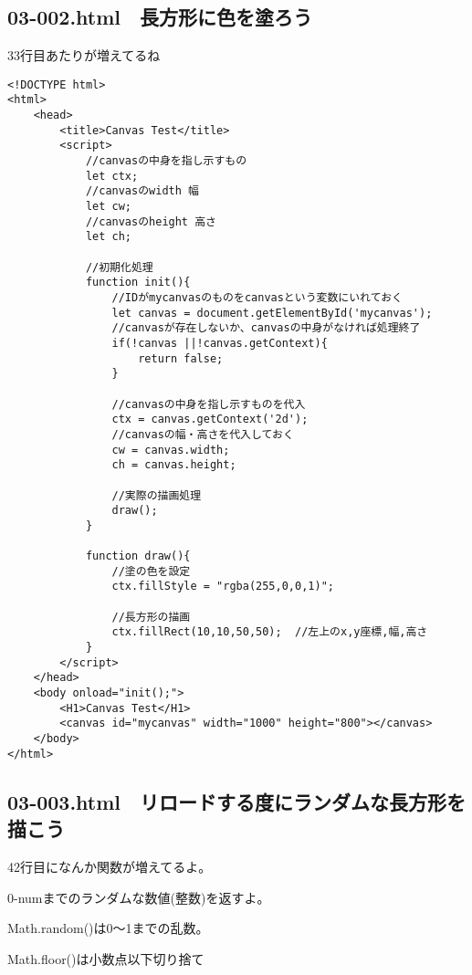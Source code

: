 \documentclass[mingoth,11pt,a4j,uplatex]{jsarticle}
\begin{document}
\subsection{03-002.html　長方形に色を塗ろう}
33行目あたりが増えてるね
\begin{lstlisting}[caption=長方形に色を塗ろう]
<!DOCTYPE html>
<html>
	<head>
		<title>Canvas Test</title>
		<script>
			//canvasの中身を指し示すもの
			let ctx;
			//canvasのwidth 幅
			let cw;
			//canvasのheight 高さ
			let ch;
			
			//初期化処理
			function init(){
				//IDがmycanvasのものをcanvasという変数にいれておく
				let canvas = document.getElementById('mycanvas');
				//canvasが存在しないか、canvasの中身がなければ処理終了
				if(!canvas ||!canvas.getContext){
					return false;
				}
				
				//canvasの中身を指し示すものを代入
				ctx = canvas.getContext('2d');
				//canvasの幅・高さを代入しておく
				cw = canvas.width;
				ch = canvas.height;
				
				//実際の描画処理
				draw();
			}
			
			function draw(){
				//塗の色を設定
				ctx.fillStyle = "rgba(255,0,0,1)";
				
				//長方形の描画
				ctx.fillRect(10,10,50,50);	//左上のx,y座標,幅,高さ
			}
		</script>
	</head>
	<body onload="init();">
		<H1>Canvas Test</H1>
		<canvas id="mycanvas" width="1000" height="800"></canvas>
	</body>
</html>
\end{lstlisting}

\subsection{03-003.html　リロードする度にランダムな長方形を描こう}
42行目になんか関数が増えてるよ。

0-numまでのランダムな数値(整数)を返すよ。

Math.random()は0〜1までの乱数。

Math.floor()は小数点以下切り捨て
\end{document}
